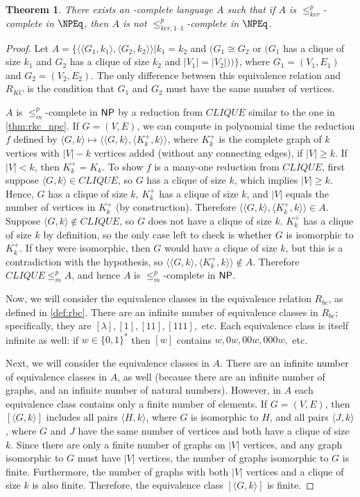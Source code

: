 \documentclass{article}
\newtheorem{theorem}{Theorem}[section]
\theoremstyle{definition} \newtheorem{definition}[definition]{Definition}
\newcommand{\sigmastar}{\{0, 1\}^{*}} %
\newcommand{\kr}{\leq^{p}_{ker}} %
\newcommand{\kri}{\leq^{p}_{ker,1\text{--}1}} %
\newcommand{\mor}{\leq^{p}_{m}} %
\newcommand{\pair}[2]{\langle#1,#2\rangle} %
\begin{document}
\begin{theorem}
  There exists an \NP-complete language $A$ such that if $A$ is $\kr$-complete
  in $\NPEq$, then $A$ is not $\kri$-complete in $\NPEq$.
\end{theorem}
\begin{proof}
  Let $A=\{\pair{\pair{G_1}{k_1}}{\pair{G_2}{k_2}}| k_1=k_2$ and $(G_1\cong
  G_2$ or $(G_1$ has a clique of size $k_1$ and $G_2$ has a clique of size
  $k_2$ and $|V_1|=|V_2|))\}$, where $G_1=(V_1, E_1)$ and $G_2=(V_2, E_2)$. The
  only difference between this equivalence relation and $R_{KC}$ is the
  condition that $G_1$ and $G_2$ must have the same number of vertices.

  $A$ is $\mor$-complete in ${\mathsf{NP}}$ by a reduction from $CLIQUE$ similar to the
  one in \autoref{thm:rkc_npc}.  If $G=(V,E)$, we can compute in polynomial
  time the reduction $f$ defined by
  $\pair{G}{k}\mapsto\pair{\pair{G}{k}}{\pair{K^+_k}{k}}$, where $K^+_k$ is the
  complete graph of $k$ vertices with $|V|-k$ vertices added (without any
  connecting edges), if $|V|\geq k$. If $|V|<k$, then $K^+_k=K_k$. To show $f$
  is a many-one reduction from $CLIQUE$, first suppose $\pair{G}{k}\in CLIQUE$,
  so $G$ has a clique of size $k$, which implies $|V|\geq k$. Hence, $G$ has a
  clique of size $k$, $K^+_k$ has a clique of size $k$, and $|V|$ equals the
  number of vertices in $K^+_k$ (by construction). Therefore
  $\pair{\pair{G}{k}}{\pair{K^+_k}{k}}\in A$. Suppose $\pair{G}{k}\notin
  CLIQUE$, so $G$ does not have a clique of size $k$. $K^+_k$ has a clique of
  size $k$ by definition, so the only case left to check is whether $G$ is
  isomorphic to $K^+_k$. If they were isomorphic, then $G$ would have a clique
  of size $k$, but this is a contradiction with the hypothesis, so
  $\pair{\pair{G}{k}}{\pair{K^+_k}{k}}\notin A$. Therefore $CLIQUE\mor A$, and
  hence $A$ is $\mor$-complete in ${\mathsf{NP}}$.

  Now, we will consider the equivalence classes in the equivalence relation
  $R_{bc}$, as defined in \autoref{def:rbc}. There are an infinite number of
  equivalence classes in $R_{bc}$; specifically, they are $[\lambda], [1],
  [11], [111],$ etc. Each equivalence class is itself infinite as well: if
  $w\in\sigmastar$ then $[w]$ contains $w, 0w, 00w, 000w,$ etc.


  Next, we will consider the equivalence classes in $A$. There are an infinite
  number of equivalence classes in $A$, as well (because there are an infinite
  number of graphs, and an infinite number of natural numbers). However, in $A$
  each equivalence class contains only a finite number of elements. If
  $G=(V,E)$, then $[\pair{G}{k}]$ includes all pairs $\pair{H}{k}$, where $G$
  is isomorphic to $H$, and all pairs $\pair{J}{k}$, where $G$ and $J$ have the
  same number of vertices and both have a clique of size $k$. Since there are
  only a finite number of graphs on $|V|$ vertices, and any graph isomorphic to
  $G$ must have $|V|$ vertices, the number of graphs isomorphic to $G$ is
  finite. Furthermore, the number of graphs with both $|V|$ vertices and a
  clique of size $k$ is also finite. Therefore, the equivalence class
  $[\pair{G}{k}]$ is finite.


\end{proof}
\end{document}
